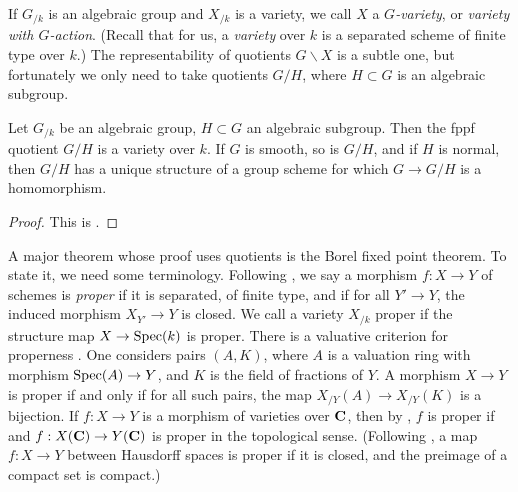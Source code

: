 If $G_{/k}$ is an algebraic group and $X_{/k}$ is a variety, we call $X$ a 
\emph{$G$-variety}, or \emph{variety with $G$-action}. (Recall that for us, 
a \emph{variety} over $k$ is a separated scheme of finite type over $k$.) The 
representability of quotients $G\backslash X$ is a subtle one, but fortunately 
we only need to take quotients $G/H$, where $H\subset G$ is an algebraic 
subgroup. 

\begin{theorem}
Let $G_{/k}$ be an algebraic group, $H\subset G$ an algebraic subgroup. Then 
the fppf quotient $G/H$ is a variety over $k$. If $G$ is smooth, so is $G/H$, 
and if $H$ is normal, then $G/H$ has a unique structure of a group scheme for 
which $G\to G/H$ is a homomorphism. 
\end{theorem}
\begin{proof}
This is \cite[VI\textsubscript{A} 3.2]{sga3-i}. 
\end{proof}

A major theorem whose proof uses quotients is the Borel fixed point theorem. 
To state it, we need some terminology. Following \cite[II 5.4.1]{ega2}, we say 
a morphism $f:X\to Y$ of schemes is \emph{proper} if it is separated, of finite 
type, and if for all $Y'\to Y$, the induced morphism $X_{Y'}\to Y$ is closed. 
We call a variety $X_{/k}$ proper if the structure map $X\to \operatorname{Spec}(k)$ is 
proper. There is a valuative criterion for properness \cite[II 7.3.8]{ega2}. 
One considers pairs $(A,K)$, where $A$ is a valuation ring with morphism 
$\operatorname{Spec}(A)\to Y$, and $K$ is the field of fractions of $Y$. A morphism 
$X\to Y$ is proper if and only if for all such pairs, the map 
$X_{/Y}(A)\to X_{/Y}(K)$ is a bijection. If $f:X\to Y$ is a morphism of 
varieties over $\mathbf{C}$, then by \cite[XII 3.2]{sga1}, $f$ is proper if and 
$f:X(\mathbf{C})\to Y(\mathbf{C})$ is proper in the topological sense. (Following 
\cite[I \S10.2 th.1]{bourbaki-topology-1-4}, a map $f:X\to Y$ between 
Hausdorff spaces is proper if it is closed, and the preimage of a compact 
set is compact.)

